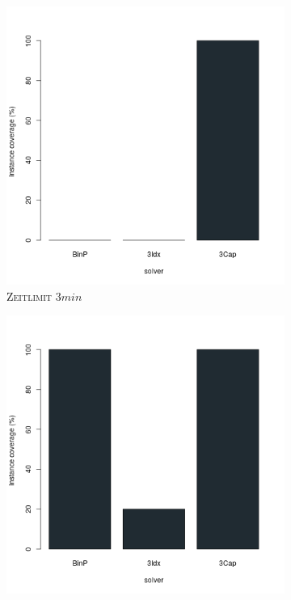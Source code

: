 \begin{figure}[H]
\centering

\begin{subfigure}[b]{0.3\textwidth}
\centering
\includegraphics[width=1.2\textwidth]{img/solver_instance_coverage_b=3_m_180s.png}
\caption{\textsc{Zeitlimit} $3min$}
\label{fig:instance_coverage_b=3_m_a}
\end{subfigure}
\hfill
\begin{subfigure}[b]{0.3\textwidth}
\centering
\includegraphics[width=1.2\textwidth]{img/solver_instance_coverage_b=3_m_300s.png}

\end{subfigure}
\end{figure}
